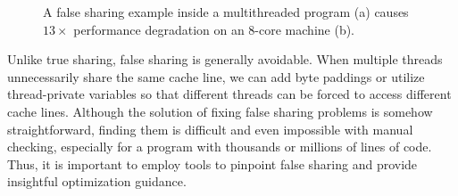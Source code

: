 \begin{figure}[htbp]
\centering
{}%
\hspace{20pt}
\caption{
A false sharing example inside a multithreaded program (a) causes $13\times$ performance degradation on an 8-core machine (b).
\label{fig:penalty}}
\end{figure}


Unlike true sharing, false sharing is generally avoidable. When multiple threads unnecessarily share the same cache line, we can add byte paddings or utilize thread-private variables so that different threads can be forced to access different cache lines. Although the solution of fixing false sharing problems is somehow straightforward, finding them is difficult and even impossible with manual checking, especially for a program with thousands or millions of lines of code. Thus, it is important to employ tools to pinpoint false sharing and provide insightful optimization guidance.

